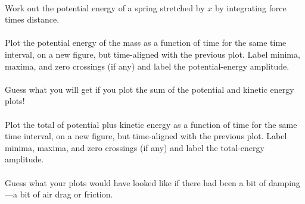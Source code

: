 \documentclass[12pt]{article}
\begin{document}
\paragraph{\theproblem}%
Work out the potential energy of a spring stretched by $x$ by
integrating force times distance.

\paragraph{\theproblem}%
Plot the potential energy of the mass as a function of time for the same time
interval, on a new figure, but time-aligned with the previous plot.  Label
minima, maxima, and zero crossings (if any) and label the potential-energy amplitude.

\paragraph{\theproblem}%
Guess what you will get if you plot the sum of the potential and kinetic energy plots!

\paragraph{\theproblem}%
Plot the total of potential plus kinetic energy as a function of time for the same time
interval, on a new figure, but time-aligned with the previous plot.  Label
minima, maxima, and zero crossings (if any) and label the total-energy amplitude.

\paragraph{\theproblem}%
Guess what your plots would have looked like if there had been a bit of
damping---a bit of air drag or friction.
\end{document}
